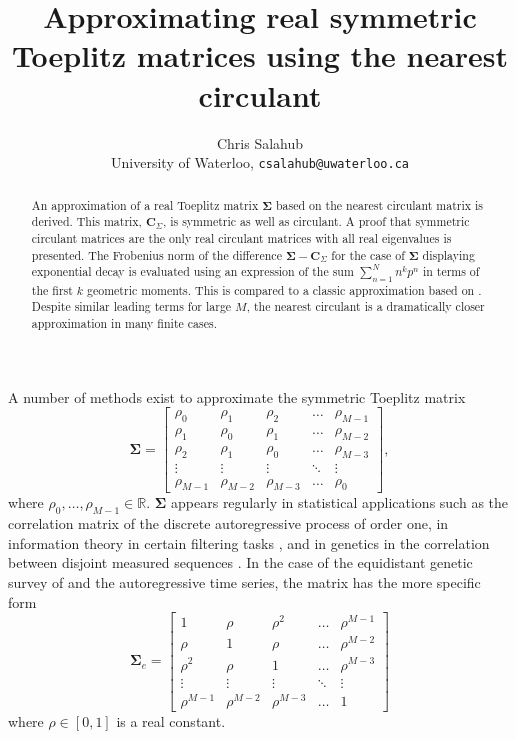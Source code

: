 \documentclass[letterpaper,12pt,oneside,final]{article}
\title{Approximating real symmetric Toeplitz matrices using the nearest circulant}
\author{Chris Salahub \\ {\footnotesize University of Waterloo, \texttt{csalahub@uwaterloo.ca}}}
\newcommand{\m}[1]{\mathbf{#1}}               %
\newcommand{\sm}[1]{\boldsymbol{#1}}   %
\newcommand{\field}[1]{\mathbb{#1}}
\newcommand{\Reals}{\field{R}}
\begin{document}
\maketitle

\begin{abstract}
  An approximation of a real Toeplitz matrix $\sm{\Sigma}$ based on the nearest circulant matrix is derived. This matrix, $\m{C}_{\Sigma}$, is symmetric as well as circulant. A proof that symmetric circulant matrices are the only real circulant matrices with all real eigenvalues is presented. The Frobenius norm of the difference $\sm{\Sigma} - \m{C}_{\Sigma}$ for the case of $\sm{\Sigma}$ displaying exponential decay is evaluated using an expression of the sum $\sum_{n=1}^{N} n^k p^n$ in terms of the first $k$ geometric moments. This is compared to a classic approximation based on \cite{grenanderszego1958}. Despite similar leading terms for large $M$, the nearest circulant is a dramatically closer approximation in many finite cases.
\end{abstract}

A number of methods exist to approximate the symmetric Toeplitz matrix
\begin{equation} \label{eq:multipleTesting:genEigCov}
  \sm{\Sigma} = \begin{bmatrix}
    \rho_0 & \rho_1 & \rho_2 & \dots & \rho_{M-1} \\
    \rho_1 & \rho_0 & \rho_1 & \dots & \rho_{M-2} \\
    \rho_2 & \rho_1 & \rho_0 & \dots & \rho_{M-3} \\
    \vdots & \vdots & \vdots & \ddots & \vdots \\
    \rho_{M-1} & \rho_{M-2} & \rho_{M-3} & \dots & \rho_0
  \end{bmatrix},
\end{equation}
where $\rho_0, \dots, \rho_{M-1} \in \Reals$. $\sm{\Sigma}$ appears regularly in statistical applications such as the correlation matrix of the discrete autoregressive process of order one, in information theory in certain filtering tasks \cite{gray2006toeplitz}, and in genetics in the correlation between disjoint measured sequences \cite{salahub2022correlation}. In the case of the equidistant genetic survey of \cite{LanderBotstein1989} and the autoregressive time series, the matrix has the more specific form
\begin{equation} \label{eq:multipleTesting:specEigCov}
  \sm{\Sigma}_e = \begin{bmatrix}
    1 & \rho & \rho^2 & \dots & \rho^{M-1} \\
    \rho & 1 & \rho & \dots & \rho^{M-2} \\
    \rho^2 & \rho & 1 & \dots & \rho^{M-3} \\
    \vdots & \vdots & \vdots & \ddots & \vdots \\
    \rho^{M-1} & \rho^{M-2} & \rho^{M-3} & \dots & 1
  \end{bmatrix}
\end{equation}
where $\rho \in [0, 1]$ is a real constant.
\end{document}

